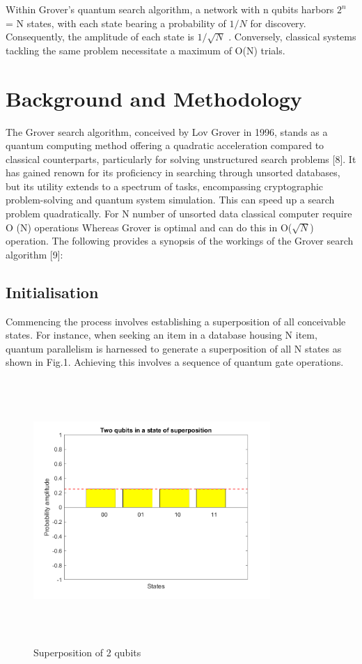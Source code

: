 \documentclass[conference]{IEEEtran}
\begin{document}
Within Grover’s quantum search algorithm, a network with
n qubits harbors $ 2^{n} $ = N states, with each state bearing a
probability of $ 1/N $ for discovery. Consequently, the amplitude
of each state is $ 1/\sqrt{N} $
. Conversely, classical systems tackling the
same problem necessitate a maximum of O(N) trials.
\section{Background and Methodology}

The Grover search algorithm, conceived by Lov Grover
in 1996, stands as a quantum computing method offering
a quadratic acceleration compared to classical counterparts,
particularly for solving unstructured search problems [8]. It
has gained renown for its proficiency in searching through
unsorted databases, but its utility extends to a spectrum
of tasks, encompassing cryptographic problem-solving and
quantum system simulation. This can speed up a search
problem quadratically. For N number of unsorted data classical
computer require O (N) operations Whereas Grover is optimal
and can do this in O($ \sqrt{N} $) operation. The following provides
a synopsis of the workings of the Grover search algorithm [9]:
\subsection{Initialisation}
Commencing the process involves establishing a superposition of all conceivable states. For instance, when seeking an
item in a database housing N item, quantum parallelism is
harnessed to generate a superposition of all N states as shown
in Fig.1. Achieving this involves a sequence of quantum gate
operations.

\begin{figure}[htbp]
	\centerline{\includegraphics[width=9cm,height=10cm,keepaspectratio]{fig1.png}}
	\caption{Superposition of 2 qubits}
	\label{fig1}
\end{figure}
\end{document}
